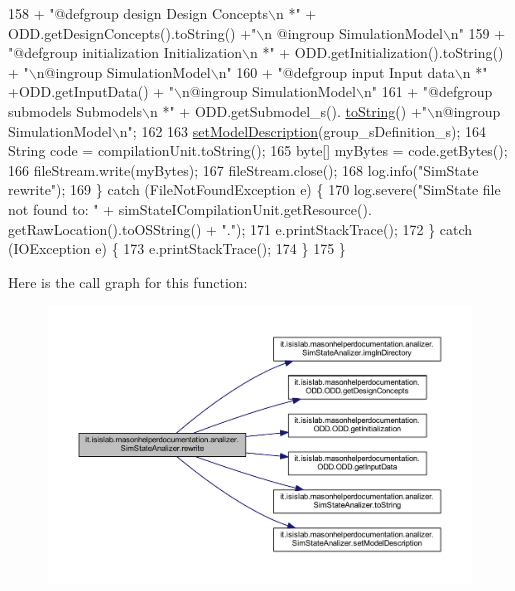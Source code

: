 \begin{DoxyCode}
158                     + \textcolor{stringliteral}{"@defgroup design Design Concepts\(\backslash\)n *"} + ODD.getDesignConcepts().toString() +\textcolor{stringliteral}{"\(\backslash\)n
      @ingroup SimulationModel\(\backslash\)n"}
159                     + \textcolor{stringliteral}{"@defgroup initialization Initialization\(\backslash\)n *"} + ODD.getInitialization().toString() + \textcolor{stringliteral}{
      "\(\backslash\)n@ingroup SimulationModel\(\backslash\)n"}
160                     + \textcolor{stringliteral}{"@defgroup input Input data\(\backslash\)n *"} +ODD.getInputData() + \textcolor{stringliteral}{"\(\backslash\)n@ingroup SimulationModel\(\backslash\)n"}
161                     + \textcolor{stringliteral}{"@defgroup submodels Submodels\(\backslash\)n *"} + ODD.getSubmodel\_s().
      \hyperlink{classit_1_1isislab_1_1masonhelperdocumentation_1_1analizer_1_1_sim_state_analizer_adc78b00761532b2b5cc84a075a1adc5f}{toString}() +\textcolor{stringliteral}{"\(\backslash\)n@ingroup SimulationModel\(\backslash\)n"};
162 
163             \hyperlink{classit_1_1isislab_1_1masonhelperdocumentation_1_1analizer_1_1_sim_state_analizer_a72ee1f15571941f5c588b71fd3265ab0}{setModelDescription}(group\_sDefinition\_s);
164             String code = compilationUnit.toString();
165             byte[] myBytes = code.getBytes();
166             fileStream.write(myBytes);
167             fileStream.close();
168             log.info(\textcolor{stringliteral}{"SimState rewrite"});
169         \} \textcolor{keywordflow}{catch} (FileNotFoundException e) \{
170             log.severe(\textcolor{stringliteral}{"SimState file not found to: "} + simStateICompilationUnit.getResource().
      getRawLocation().toOSString() + \textcolor{stringliteral}{"."});
171             e.printStackTrace();
172         \} \textcolor{keywordflow}{catch} (IOException e) \{
173             e.printStackTrace();
174         \}       
175     \}
\end{DoxyCode}


Here is the call graph for this function\-:\nopagebreak
\begin{figure}[H]
\begin{center}
\leavevmode
\includegraphics[width=350pt]{classit_1_1isislab_1_1masonhelperdocumentation_1_1analizer_1_1_sim_state_analizer_aa91938db714ec7b05134139ce741e61d_cgraph}
\end{center}
\end{figure}


